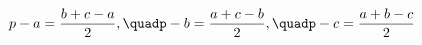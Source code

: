 \documentclass[preview]{standalone}
\begin{document}
\begin{align*}
\special{dvisvgm:raw <g id='unique000'>}p - a = \frac{b + c - a}{2}, \quadp - b = \frac{a + c - b}{2}, \quadp - c = \frac{a + b - c}{2}\special{dvisvgm:raw </g>}
\end{align*}
\end{document}
